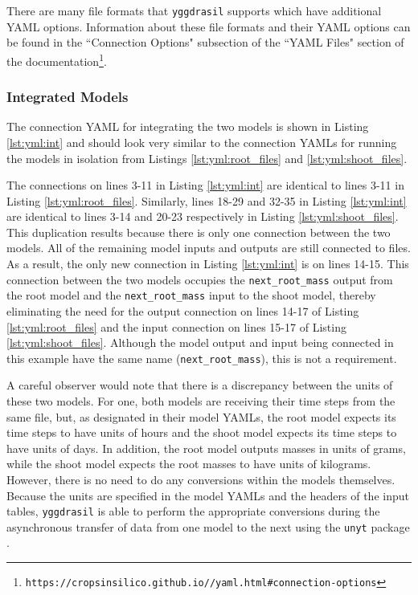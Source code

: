 \documentclass[journal]{IEEEtran}
\newcommand{\todo}[1]{{\color{red}{#1}}}
\newcommand{\pkg}{{\tt yggdrasil}{}}
\newcommand{\pkglink}{\todo{cis\_interface}}
\newcommand{\intyml}{}
\begin{document}
There are many file formats that {\pkg} supports which have additional YAML options.
Information about these file formats and their YAML options can be found in the ``Connection Options" subsection of the ``YAML Files" section of the documentation\footnote{{\tt https://cropsinsilico.github.io/\pkglink/yaml.html\#connection-options}}.

\subsubsection{Integrated Models}
%
The connection YAML for integrating the two models is shown in Listing \ref{lst:yml:int} and should look very similar to the connection YAMLs for running the models in isolation from Listings \ref{lst:yml:root_files} and \ref{lst:yml:shoot_files}. 
%
\intyml
%
The connections on lines 3-11 in Listing \ref{lst:yml:int} are identical to lines 3-11 in Listing \ref{lst:yml:root_files}. Similarly, lines 18-29 and 32-35 in Listing \ref{lst:yml:int} are identical to lines 3-14 and 20-23 respectively in Listing \ref{lst:yml:shoot_files}. This duplication results because there is only one connection between the two models. All of the remaining model inputs and outputs are still connected to files. As a result, the only new connection in Listing \ref{lst:yml:int} is on lines 14-15. This connection between the two models occupies the {\tt next\_root\_mass} output from the root model and the {\tt next\_root\_mass} input to the shoot model, thereby eliminating the need for the output connection on lines 14-17 of Listing \ref{lst:yml:root_files} and the input connection on lines 15-17 of Listing \ref{lst:yml:shoot_files}. Although the model output and input being connected in this example have the same name ({\tt next\_root\_mass}), this is not a requirement.

A careful observer would note that there is a discrepancy between the units of these two models. For one, both models are receiving their time steps from the same file, but, as designated in their model YAMLs, the root model expects its time steps to have units of hours and the shoot model expects its time steps to have units of days. In addition, the root model outputs masses in units of grams, while the shoot model expects the root masses to have units of kilograms. However, there is no need to do any conversions within the models themselves. Because the units are specified in the model YAMLs and the headers of the input tables, {\pkg} is able to perform the appropriate conversions during the asynchronous transfer of data from one model to the next using the {\tt unyt} package \citep{Goldbaum2018}. 
\end{document}
